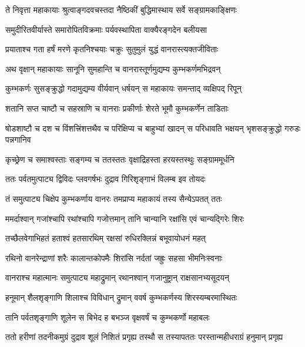 
\twolineshloka
{ते निवृत्ता महाकायाः श्रुत्वाङ्गदवचस्तदा}
{नैष्ठिकीं बुद्धिमास्थाय सर्वे सङ्ग्रामकाङ्क्षिणः} %

\twolineshloka
{समुदीरितवीर्यास्ते समारोपितविक्रमाः}
{पर्यवस्थापिता वाक्यैरङ्गदेन बलीयसा} %

\twolineshloka
{प्रयाताश्च गता हर्षं मरणे कृतनिश्चयाः}
{चक्रुः सुतुमुलं युद्धं वानरास्त्यक्तजीविताः} %

\twolineshloka
{अथ वृक्षान् महाकायाः सानूनि सुमहान्ति च}
{वानरास्तूर्णमुद्यम्य कुम्भकर्णमभिद्रवन्} %

\twolineshloka
{कुम्भकर्णः सुसङ्क्रुद्धो गदामुद्यम्य वीर्यवान्}
{धर्षयन् स महाकायः समन्ताद् व्यक्षिपद् रिपून्} %

\twolineshloka
{शतानि सप्त चाष्टौ च सहस्राणि च वानराः}
{प्रकीर्णाः शेरते भूमौ कुम्भकर्णेन ताडिताः} %

\threelineshloka
{षोडशाष्टौ च दश च विंशत्त्रिंशत्तथैव च}
{परिक्षिप्य च बाहुभ्यां खादन् स परिधावति}
{भक्षयन् भृशसङ्क्रुद्धो गरुडः पन्नगानिव} %

\twolineshloka
{कृच्छ्रेण च समाश्वस्ताः सङ्गम्य च ततस्ततः}
{वृक्षाद्रिहस्ता हरयस्तस्थुः सङ्ग्राममूर्धनि} %

\twolineshloka
{ततः पर्वतमुत्पाट्य द्विविदः प्लवगर्षभः}
{दुद्राव गिरिशृङ्गाभं विलम्ब इव तोयदः} %

\twolineshloka
{तं समुत्पाट्य चिक्षेप कुम्भकर्णाय वानरः}
{तमप्राप्य महाकायं तस्य सैन्येऽपतत् ततः} %

\twolineshloka
{ममर्दाश्वान् गजांश्चापि रथांश्चापि गजोत्तमान्}
{तानि चान्यानि रक्षांसि एवं चान्यद्गिरेः शिरः} %

\twolineshloka
{तच्छैलवेगाभिहतं हताश्वं हतसारथिम्}
{रक्षसां रुधिरक्लिन्नं बभूवायोधनं महत्} %

\twolineshloka
{रथिनो वानरेन्द्राणां शरैः कालान्तकोपमैः}
{शिरांसि नर्दतां जह्रुः सहसा भीमनिःस्वनाः} %

\twolineshloka
{वानराश्च महात्मानः समुत्पाट्य महाद्रुमान्}
{रथानश्वान् गजानुष्ट्रान् राक्षसानभ्यसूदयन्} %

\twolineshloka
{हनूमान् शैलशृङ्गाणि शिलाश्च विविधान् द्रुमान्}
{ववर्ष कुम्भकर्णस्य शिरस्यम्बरमास्थितः} %

\twolineshloka
{तानि पर्वतशृङ्गाणि शूलेन स बिभेद ह}
{बभञ्ज वृक्षवर्षं च कुम्भकर्णो महाबलः} %

\twolineshloka
{ततो हरीणां तदनीकमुग्रं दुद्राव शूलं निशितं प्रगृह्य}
{तस्थौ स तस्यापततः परस्तान्महीधराग्रं हनुमान् प्रगृह्य} %

